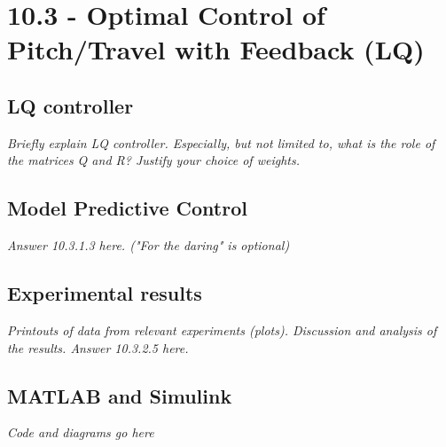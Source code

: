 \section{10.3 - Optimal Control of Pitch/Travel with Feedback (LQ)}

\subsection{LQ controller}
\textit{Briefly explain LQ controller. Especially, but not limited to, what is the role of the matrices Q and R? Justify your choice of weights.}

\subsection{Model Predictive Control}
\textit{Answer 10.3.1.3 here. ("For the daring" is optional)}

\subsection{Experimental results}
\textit{Printouts of data from relevant experiments (plots).
Discussion and analysis of the results.
Answer 10.3.2.5 here.}

\subsection{MATLAB and Simulink}
\textit{Code and diagrams go here}
	
